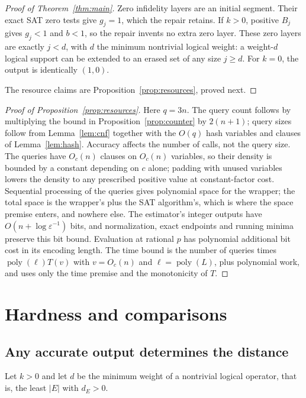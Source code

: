 \documentclass[11pt]{article}
\theoremstyle{remark}
\newcommand{\poly}{\operatorname{poly}}
\newcommand{\eps}{\varepsilon}
\begin{document}
\begin{proof}[Proof of Theorem~\ref{thm:main}]
Zero infidelity layers are an initial segment. Their exact SAT zero
tests give \(g_j=1\), which the repair retains. If \(k>0\), positive
\(B_j\) gives \(g_j<1\) and \(b<1\), so the repair invents no extra
zero layer. These zero layers are exactly \(j<d\), with \(d\) the
minimum nontrivial logical weight: a weight-\(d\) logical support
can be extended to an erased set of any size \(j\ge d\).
For \(k=0\), the output is identically \((1,0)\).

The resource claims are Proposition~\ref{prop:resources}, proved next.
\end{proof}

\begin{proof}[Proof of Proposition~\ref{prop:resources}]
Here \(q=3n\). The query count follows by multiplying the bound in
Proposition~\ref{prop:counter} by \(2(n+1)\); query sizes follow
from Lemma~\ref{lem:cnf} together with the \(O(q)\) hash variables and
clauses of Lemma~\ref{lem:hash}. Accuracy affects the number of calls,
not the query size. The queries have \(O_c(n)\) clauses on \(O_c(n)\)
variables, so their density is bounded by a constant depending on \(c\)
alone; padding with unused variables lowers the density to any
prescribed positive value at constant-factor cost. Sequential processing
of the queries gives polynomial space for the wrapper; the total space
is the wrapper's plus the SAT algorithm's, which is where the space
premise enters, and nowhere else. The estimator's integer outputs have
\(O(n+\log\eps^{-1})\) bits, and normalization, exact endpoints and
running minima preserve this bit bound. Evaluation at rational \(p\) has
polynomial additional bit cost in its encoding length. The time bound is
the number of queries times \(\poly(\ell)T(v)\) with \(v=O_c(n)\) and
\(\ell=\poly(L)\), plus polynomial work, and uses only the time premise
and the monotonicity of \(T\).
\end{proof}

\section{Hardness and comparisons}
\label{sec:hardness}

\subsection{Any accurate output determines the distance}

Let \(k>0\) and let \(d\) be the minimum weight of a nontrivial logical
operator, that is, the least \(|E|\) with \(d_E>0\).
\end{document}
